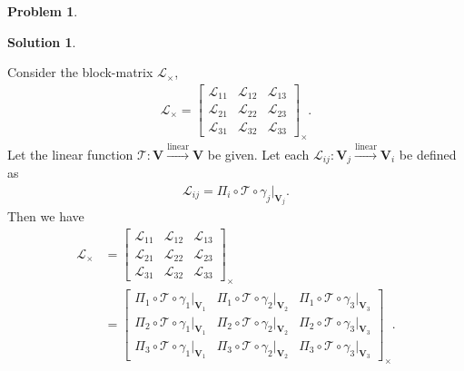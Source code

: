 \documentclass{article}
\theoremstyle{definition}
\newtheorem*{prob*}{Problem}
\newtheorem*{sln*}{Solution}
\newcommand{\V}{\mathbf{V}}
\newcommand{\lag}{\mathcal{L}}
\newcommand{\lin}{\overset{\text{linear}}{\longrightarrow}}
\newcommand{\T}{\mathcal{T}}
\begin{document}
\begin{prob*}
\begin{sln*}
\begin{enumerate}
\begin{enumerate}
			Consider the block-matrix $\lag_\times$,
			\begin{align*}
			\lag_\times = \begin{bmatrix}
			\lag_{11} & \lag_{12} & \lag_{13}\\
			\lag_{21} & \lag_{22} & \lag_{23}\\
			\lag_{31} & \lag_{32} & \lag_{33} 
			\end{bmatrix}_\times.
			\end{align*}
			Let the linear function $\T : \V \lin \V$ be given. Let each $\lag_{ij} : \V_j \lin \V_i$ be defined as
			\begin{align*}
			\lag_{ij} = \Pi_i \circ \T \circ \gamma_j\bigg\vert_{\V_j}.
			\end{align*}
			Then we have
			\begin{align*}
			\lag_\times &= \begin{bmatrix}
			\lag_{11} & \lag_{12} & \lag_{13}\\
			\lag_{21} & \lag_{22} & \lag_{23}\\
			\lag_{31} & \lag_{32} & \lag_{33} 
			\end{bmatrix}_\times\\
			&=
			\begin{bmatrix}
			\Pi_1 \circ \T \circ \gamma_1\bigg\vert_{\V_1} & \Pi_1 \circ \T \circ \gamma_2\bigg\vert_{\V_2} & \Pi_1 \circ \T \circ \gamma_3\bigg\vert_{\V_3}\\
			\Pi_2 \circ \T \circ \gamma_1\bigg\vert_{\V_1} & \Pi_2 \circ \T \circ \gamma_2\bigg\vert_{\V_2} & \Pi_2 \circ \T \circ \gamma_3\bigg\vert_{\V_3}\\
			\Pi_3 \circ \T \circ \gamma_1\bigg\vert_{\V_1} & \Pi_3 \circ \T \circ \gamma_2\bigg\vert_{\V_2} & \Pi_3 \circ \T \circ \gamma_3\bigg\vert_{\V_3} 
			\end{bmatrix}_\times.
			\end{align*}
			
			
			

\end{enumerate}
\end{enumerate}
\end{sln*}
\end{prob*}
\end{document}
